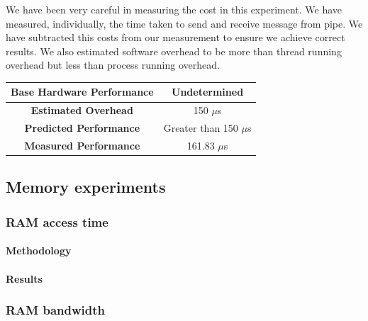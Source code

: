 \documentclass[conference]{IEEEtran}
\begin{document}
We have been very careful in measuring the cost in this experiment. We have measured, individually, the time taken to send and receive message from pipe. We have subtracted this costs from our measurement to ensure we achieve correct results.
We also estimated software overhead to be more than thread running overhead but less than process running overhead.

\begin{center}
\begin{tabular}{ |c|c| } 
  \hline
  \textbf{Base Hardware Performance} & Undetermined \\ 
  \hline
  \textbf{Estimated Overhead} &  150 $\mu$s \\ 
  \hline
  \textbf{Predicted Performance} & Greater than 150 $\mu$s \\ 
  \hline
  \textbf{Measured Performance} & 161.83 $\mu$s \\ 
  \hline
\end{tabular}
\end{center}


\subsection{Memory experiments}


\subsubsection{RAM access time}

\paragraph{Methodology}

\paragraph{Results}



\subsubsection{RAM bandwidth}
\end{document}
